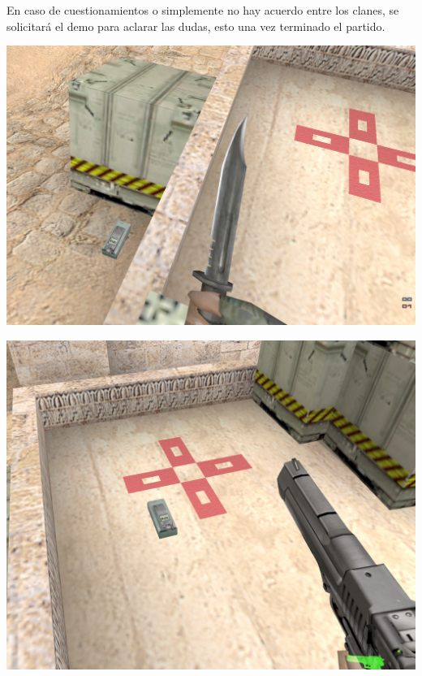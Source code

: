 \documentclass[a4paper, 11pt]{article}
\begin{document}
    En caso de cuestionamientos o simplemente no hay acuerdo entre los clanes, se solicitará el demo para aclarar las dudas, esto una vez terminado el partido.
    
    \begin{minipage}{0.40\textwidth}
        \centering
        \includegraphics[width=\textwidth]{img/c4_bug.png}
    \end{minipage}
    \hspace{0.05\textwidth}
    \begin{minipage}{0.45\textwidth}
        \centering
        \includegraphics[width=\textwidth]{img/c4_nobug.png}
    \end{minipage}
\end{document}
